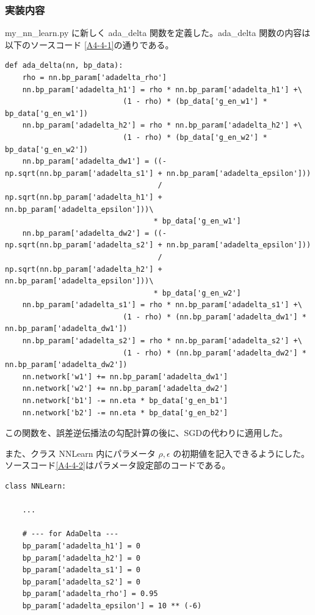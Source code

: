 \documentclass[a4paper,dvipdfmx]{jsarticle}
\begin{document}
\subsubsection*{実装内容}
my\_nn\_learn.py に新しく ada\_delta 関数を定義した。ada\_delta 関数の内容は以下のソースコード \ref{A4-4-1}の通りである。
\begin{lstlisting}[caption="AdaDelta",label=A4-4-1]
def ada_delta(nn, bp_data):
    rho = nn.bp_param['adadelta_rho']
    nn.bp_param['adadelta_h1'] = rho * nn.bp_param['adadelta_h1'] +\
                           (1 - rho) * (bp_data['g_en_w1'] * bp_data['g_en_w1'])
    nn.bp_param['adadelta_h2'] = rho * nn.bp_param['adadelta_h2'] +\
                           (1 - rho) * (bp_data['g_en_w2'] * bp_data['g_en_w2'])
    nn.bp_param['adadelta_dw1'] = ((-np.sqrt(nn.bp_param['adadelta_s1'] + nn.bp_param['adadelta_epsilon']))
                                   / np.sqrt(nn.bp_param['adadelta_h1'] + nn.bp_param['adadelta_epsilon']))\
                                  * bp_data['g_en_w1']
    nn.bp_param['adadelta_dw2'] = ((-np.sqrt(nn.bp_param['adadelta_s2'] + nn.bp_param['adadelta_epsilon']))
                                   / np.sqrt(nn.bp_param['adadelta_h2'] + nn.bp_param['adadelta_epsilon']))\
                                  * bp_data['g_en_w2']
    nn.bp_param['adadelta_s1'] = rho * nn.bp_param['adadelta_s1'] +\
                           (1 - rho) * (nn.bp_param['adadelta_dw1'] * nn.bp_param['adadelta_dw1'])
    nn.bp_param['adadelta_s2'] = rho * nn.bp_param['adadelta_s2'] +\
                           (1 - rho) * (nn.bp_param['adadelta_dw2'] * nn.bp_param['adadelta_dw2'])
    nn.network['w1'] += nn.bp_param['adadelta_dw1']
    nn.network['w2'] += nn.bp_param['adadelta_dw2']
    nn.network['b1'] -= nn.eta * bp_data['g_en_b1']
    nn.network['b2'] -= nn.eta * bp_data['g_en_b2']
\end{lstlisting}

この関数を、誤差逆伝播法の勾配計算の後に、SGDの代わりに適用した。

また、クラス NNLearn 内にパラメータ $\rho, \epsilon$ の初期値を記入できるようにした。ソースコード\ref{A4-4-2}はパラメータ設定部のコードである。
\begin{lstlisting}[caption="AdaDelta のパラメータ設定部",label=A4-4-2]
class NNLearn:

	...
	
    # --- for AdaDelta ---
    bp_param['adadelta_h1'] = 0
    bp_param['adadelta_h2'] = 0
    bp_param['adadelta_s1'] = 0
    bp_param['adadelta_s2'] = 0
    bp_param['adadelta_rho'] = 0.95
    bp_param['adadelta_epsilon'] = 10 ** (-6)
\end{lstlisting}
\end{document}
